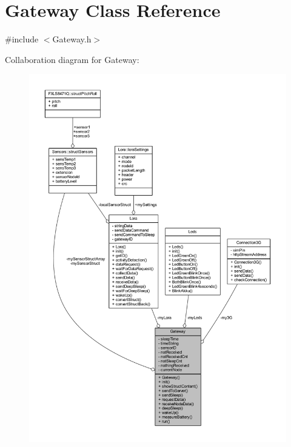 \hypertarget{class_gateway}{}\section{Gateway Class Reference}
\label{class_gateway}


{\ttfamily \#include $<$Gateway.\+h$>$}



Collaboration diagram for Gateway\+:
\nopagebreak
\begin{figure}[H]
\begin{center}
\leavevmode
\includegraphics[width=350pt]{class_gateway__coll__graph}
\end{center}
\end{figure}
